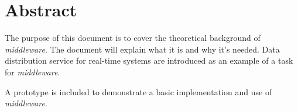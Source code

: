 \chapter*{Abstract}
The purpose of this document is to cover the theoretical background of \emph{middleware}. The document will explain what it is and why it's needed. Data distribution service for real-time systems are introduced as an example of a task for \emph{middleware}.

A prototype is included to demonstrate a basic implementation and use of \emph{middleware}.
